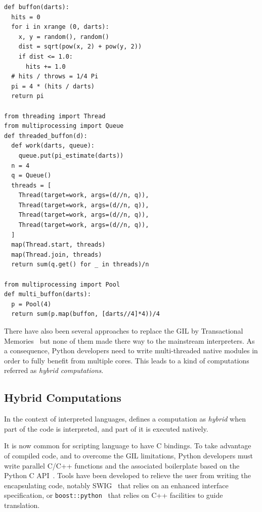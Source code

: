 \documentclass[conference]{IEEEtran}
\begin{document}
\begin{lstlisting}[float, label={lst:buffon-python}, caption={Implementation of
sequential and parallel version of the Buffon algorithm in Python.}]
def buffon(darts):
  hits = 0
  for i in xrange (0, darts):
    x, y = random(), random()
    dist = sqrt(pow(x, 2) + pow(y, 2))
    if dist <= 1.0:
      hits += 1.0
  # hits / throws = 1/4 Pi
  pi = 4 * (hits / darts)
  return pi

from threading import Thread
from multiprocessing import Queue
def threaded_buffon(d):
  def work(darts, queue):
    queue.put(pi_estimate(darts))
  n = 4
  q = Queue()
  threads = [
    Thread(target=work, args=(d//n, q)),
    Thread(target=work, args=(d//n, q)),
    Thread(target=work, args=(d//n, q)),
    Thread(target=work, args=(d//n, q)),
  ]
  map(Thread.start, threads)
  map(Thread.join, threads)
  return sum(q.get() for _ in threads)/n

from multiprocessing import Pool
def multi_buffon(darts):
  p = Pool(4)
  return sum(p.map(buffon, [darts//4]*4))/4
\end{lstlisting}

There have also been several approaches to replace the GIL by Transactional
Memories~\cite{Riley2006,Tabba2010} but none of them made there way to the
mainstream interpreters.  As a consequence, Python developers need to write
multi-threaded native modules in order to fully benefit from multiple cores.
This leads to a kind of computations referred as \emph{hybrid computations}.


\subsection{Hybrid Computations}

In the context of interpreted languages, \cite{dongara2007} defines a computation
as \emph{hybrid} when part of the code is interpreted, and part of it is
executed natively.

It is now common for scripting language to have C bindings. To take advantage of
compiled code, and to overcome the GIL limitations, Python developers must write
parallel C/C++ functions and the associated boilerplate based on the Python C
API~\cite{pythoncapi}. Tools have been developed to relieve the user from
writing the encapsulating code, notably SWIG~\cite{swig2003} that relies on an
enhanced interface specification, or
\texttt{boost::python}~\cite{boostpython2007} that relies on C++ facilities to
guide translation.
\end{document}
